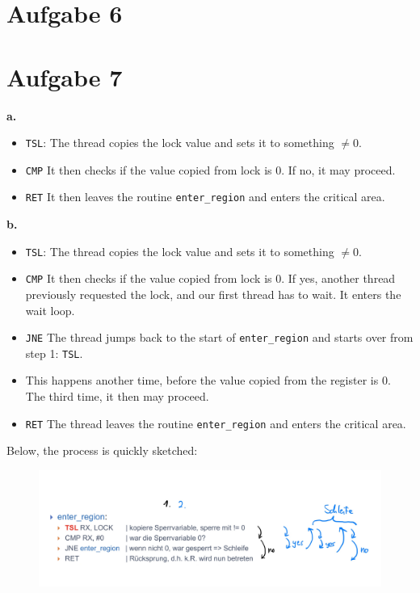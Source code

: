 \documentclass{article}
\begin{document}
\section*{Aufgabe 6}
\section*{Aufgabe 7}
\textbf{a.}
\begin{itemize}
    \item \texttt{TSL}: The thread copies the lock value and sets it to something \( 
	    \neq 0  \).
    \item \texttt{CMP} It then checks if the value copied from lock is 0. If no, it
       may proceed.
   \item \texttt{RET} It then leaves the routine \texttt{enter\_region} and
      enters the critical area. 
\end{itemize}
\textbf{b.} 
\begin{itemize}
    \item \texttt{TSL}: The thread copies the lock value and sets it to something \( 
	    \neq 0  \).
    \item \texttt{CMP} It then checks if the value copied from lock is 0.
	If yes, another thread previously requested the lock, and our first
	thread has to wait. It enters the wait loop.
	\item \texttt{JNE} The thread jumps back to the start of
	    \texttt{enter\_region} and starts over from step 1: \texttt{TSL}. 
	\item This happens another time, before the value copied from the
	   register is 0. The third time, it then may proceed. 
       \item \texttt{RET} The thread leaves the routine \texttt{enter\_region}
	   and enters the critical area.
\end{itemize}
Below, the process is quickly sketched:
\begin{figure}[H]
    \centering
    \includegraphics[width=8\textwidth]{Sketch.jpg}
\end{figure}
\end{document}
